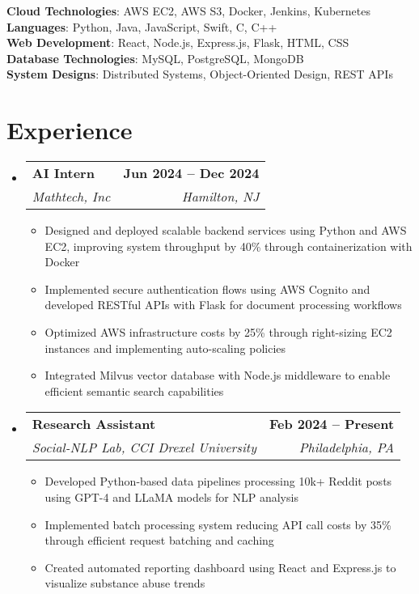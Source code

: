 \documentclass[letterpaper,11pt]{article}
\makeatletter
\newcommand{\resumeItem}[1]{
  \item\small{
    {#1 \vspace{-2pt}}
  }
}
\newcommand{\resumeSubheading}[4]{
  \vspace{-2pt}\item
    \begin{tabular*}{1.0\textwidth}[t]{l@{\extracolsep{\fill}}r}
      \textbf{#1} & \textbf{\small #2} \\
      \textit{\small#3} & \textit{\small #4} \\
    \end{tabular*}\vspace{-7pt}
}
\newcommand{\resumeSubHeadingListStart}{\begin{itemize}[leftmargin=0.0in, label={}]}
\newcommand{\resumeSubHeadingListEnd}{\end{itemize}}
\newcommand{\resumeItemListStart}{\begin{itemize}}
\newcommand{\resumeItemListEnd}{\end{itemize}\vspace{-5pt}}
\makeatother
\begin{document}
\begin{itemize}[leftmargin=0.15in, label={}]
	\small{\item{
		\textbf{Cloud Technologies}{: AWS EC2, AWS S3, Docker, Jenkins, Kubernetes} \\
		\textbf{Languages}{: Python, Java, JavaScript, Swift, C, C++} \\
		\textbf{Web Development}{: React, Node.js, Express.js, Flask, HTML, CSS} \\
		\textbf{Database Technologies}{: MySQL, PostgreSQL, MongoDB} \\
            \textbf{System Designs}{: Distributed Systems, Object-Oriented Design, REST APIs}}
	}
\end{itemize}
\vspace{-15pt}

\section{Experience}
  \resumeSubHeadingListStart
    \resumeSubheading
    {AI Intern}{Jun 2024 -- Dec 2024}
    {Mathtech, Inc}{Hamilton, NJ}
    \resumeItemListStart
        \resumeItem{Designed and deployed scalable backend services using Python and AWS EC2, improving system throughput by 40\% through containerization with Docker}
        \resumeItem{Implemented secure authentication flows using AWS Cognito and developed RESTful APIs with Flask for document processing workflows}
        \resumeItem{Optimized AWS infrastructure costs by 25\% through right-sizing EC2 instances and implementing auto-scaling policies}
        \resumeItem{Integrated Milvus vector database with Node.js middleware to enable efficient semantic search capabilities}
    \resumeItemListEnd
    \resumeSubheading
    {Research Assistant}{Feb 2024 -- Present}
    {Social-NLP Lab, CCI Drexel University}{Philadelphia, PA}
    \resumeItemListStart
        \resumeItem{Developed Python-based data pipelines processing 10k+ Reddit posts using GPT-4 and LLaMA models for NLP analysis}
        \resumeItem{Implemented batch processing system reducing API call costs by 35\% through efficient request batching and caching}
        \resumeItem{Created automated reporting dashboard using React and Express.js to visualize substance abuse trends}
    \resumeItemListEnd
\resumeSubHeadingListEnd
\vspace{-15pt}

\end{document}
